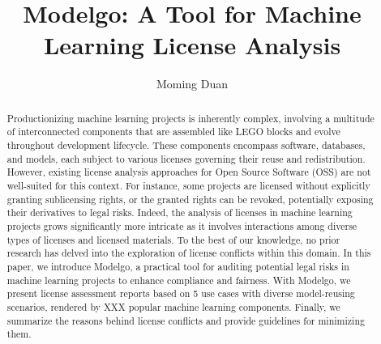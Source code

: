 \documentclass[sigconf, nonacm]{acmart}
\begin{document}
\title{Modelgo: A Tool for Machine Learning License Analysis}

\author{Moming Duan}

\renewcommand{\shortauthors}{X et al.}

\begin{abstract}
  Productionizing machine learning projects is inherently complex, involving a multitude of interconnected components that are assembled like LEGO blocks and evolve throughout development lifecycle.
  These components encompass software, databases, and models, each subject to various licenses governing their reuse and redistribution.
  However, existing license analysis approaches for Open Source Software (OSS) are not well-suited for this context.
  For instance, some projects are licensed without explicitly granting sublicensing rights, or the granted rights can be revoked, potentially exposing their derivatives to legal risks.
  Indeed, the analysis of licenses in machine learning projects grows significantly more intricate as it involves interactions among diverse types of licenses and licensed materials.
  To the best of our knowledge, no prior research has delved into the exploration of license conflicts within this domain.
  In this paper, we introduce Modelgo, a practical tool for auditing potential legal risks in machine learning projects to enhance compliance and fairness.
  With Modelgo, we present license assessment reports based on 5 use cases with diverse model-reusing scenarios, rendered by XXX popular machine learning components.
  Finally, we summarize the reasons behind license conflicts and provide guidelines for minimizing them.
\end{abstract}
\end{document}
